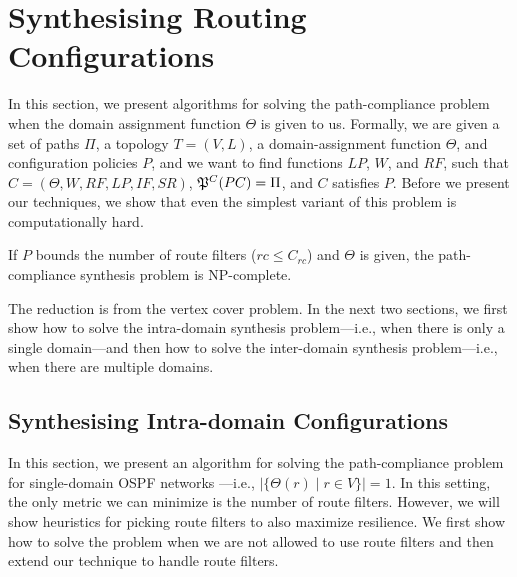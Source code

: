 \section{Synthesising Routing Configurations}
\label{sec:config-synthesis}

In this section, we present algorithms for 
solving the path-compliance problem when the domain
assignment function $\Theta$ is given to us.
Formally, we are given a set of paths $\Pi$,
a topology $T=(V,L)$,
a domain-assignment function $\Theta$, 
and configuration policies $P$,
and we want to find functions
$LP$, $W$, and $RF$,  such that
$C=(\Theta,W,RF,LP,IF,SR)$,
$\mathfrak{P}^C(PC) = \Pi$, and
$C$ satisfies $P$.
Before we present our techniques,
we  show that
even the simplest variant of this problem is computationally hard.
\begin{theorem}
\label{thm:ospfsynth}
If $P$ bounds the number of route filters ($rc\leq C_{rc}$) and $\Theta$ is given, the path-compliance synthesis
problem is NP-complete.
\end{theorem}
\iffull

\else
The reduction is from the vertex cover problem.
\fi
In the next two sections, we first show how to solve the intra-domain synthesis problem---i.e., when there
is only a single domain---and then how to solve the inter-domain synthesis problem---i.e., when
there are multiple domains.

\subsection{Synthesising Intra-domain Configurations} \label{sec:intra-synthesis}
In this section, we present an algorithm for 
solving the path-compliance problem for 
single-domain OSPF networks
---i.e., $|\{\Theta(r) \mid r\in V\}|=1$.
In this setting, the only metric we can minimize is the number of route filters.
However, we will show heuristics for picking route filters to also maximize resilience.
We first show how to solve the problem when
we are not allowed to use route filters
and then
extend our technique to handle route filters.

